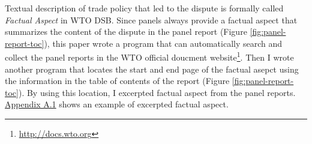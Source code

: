 Textual description of trade policy that 
led to the dispute is formally called 
\textit{Factual Aspect} in WTO DSB. 
Since panels
always provide a factual aspect
that summarizes the content of the dispute
in the panel report (Figure \ref{fig:panel-report-toc}),
this paper wrote a program that can 
automatically search and collect 
the panel reports in the WTO official doucment website\footnote{
    \url{http://docs.wto.org}
}.
Then I wrote another program that locates the start 
and end page of the factual asepct using the information in the 
table of contents of the report (Figure \ref{fig:panel-report-toc}).
By using this location, I excerpted factual aspect 
from the panel reports. 
\hyperref[sub:factual-aspect-example]{Appendix A.1} shows an
example of excerpted factual aspect.





